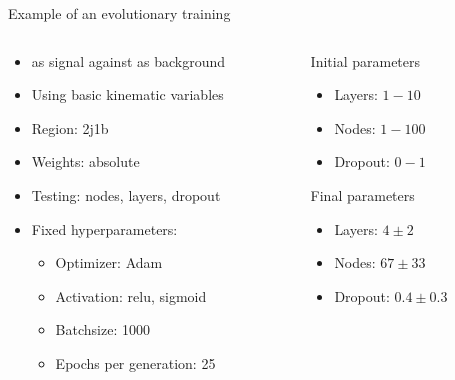 \begin{frame}{Example of an evolutionary training}
    \begin{columns}
        \begin{column}{0.5\textwidth}
            \begin{itemize}
                \item \tHq as signal against \ttbar as background
                \item Using basic kinematic variables
                \item Region: 2j1b
                \item Weights: absolute
                \item Testing: nodes, layers, dropout
                \item Fixed hyperparameters:
                    \begin{itemize}
                        \item Optimizer: Adam
                        \item Activation: relu, sigmoid
                        \item Batchsize: 1000
                        \item Epochs per generation: 25
                    \end{itemize}
            \end{itemize}
        \end{column}
            \begin{column}{0.5\textwidth}
                \begin{block}{Initial parameters}
                    \begin{itemize}
                        \item Layers: $1-10$
                        \item Nodes: $1-100$
                        \item Dropout: $0-1$
                    \end{itemize}
                \end{block}
                \begin{block}{Final parameters}
                    \begin{itemize}
                        \item Layers: $4\pm2$
                        \item Nodes: $67\pm33$
                        \item Dropout: $0.4\pm0.3$
                    \end{itemize}
                \end{block}
        \end{column}
    \end{columns}
\end{frame}


